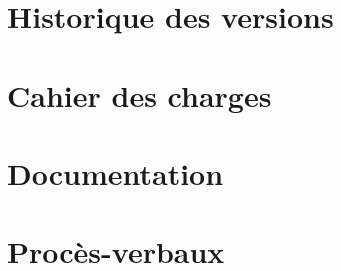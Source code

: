 \appendix

\chapter{Historique des versions}


\chapter{Cahier des charges}


\chapter{Documentation}


% 

\chapter{Procès-verbaux}




